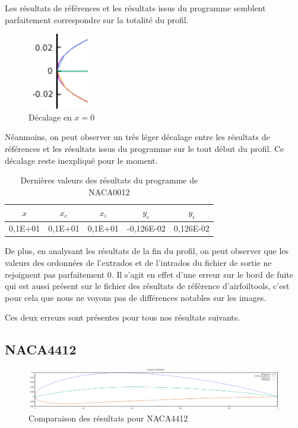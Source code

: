 \documentclass[a4paper,oneside]{article}
\makeatletter
\def\bigcenter{\trivlist \bigcentering\item\relax}
\def\bigcentering{\let\\\@centercr\rightskip\@bigflushglue%
\leftskip\@bigflushglue
\parindent\z@\parfillskip\z@skip}
\makeatother
\begin{document}
Les résultats de références et les résultats issus du programme semblent parfaitement correspondre sur la totalité du profil. 

\begin{figure}[h!]
\centering
\includegraphics[scale=0.4]{decalage0.png}
\caption{Décalage en $x=0$ }
\end{figure}

Néanmoins, on peut observer un très léger décalage entre les résultats de références et les résultats issus du programme sur le tout début du profil. Ce décalage reste inexpliqué pour le moment.
\begin{table}[h!]
\begin{center}
\begin{tabular}{|c|c|c|c|c|}
	\hline
   $x$ & $x_e$ & $x_i$ & $y_e$ & $y_i$\\
   \hline
   0,1E+01 & 0,1E+01 & 0,1E+01 & -0,126E-02 & 0,126E-02 \\
   \hline
   
\end{tabular}
\caption{Dernières valeurs des résultats du programme de NACA0012}
\end{center}
\end{table}

De plus, en analysant les résultats de la fin du profil, on peut observer que les valeurs des ordonnées de l'extrados et de l'intrados du fichier de sortie ne rejoignent pas parfaitement 0. Il s'agit en effet d'une erreur sur le bord de fuite qui est aussi présent sur le fichier des résultats de référence d'airfoiltools, c'est pour cela que nous ne voyons pas de différences notables sur les images.


Ces deux erreurs sont présentes pour tous nos résultats suivants.


\subsection{NACA4412}

\begin{figure}[h!]
\bigcenter
\includegraphics[scale=0.4]{Validation4412.png}
\caption{Comparaison des résultats pour NACA4412}
\end{figure}
\end{document}
